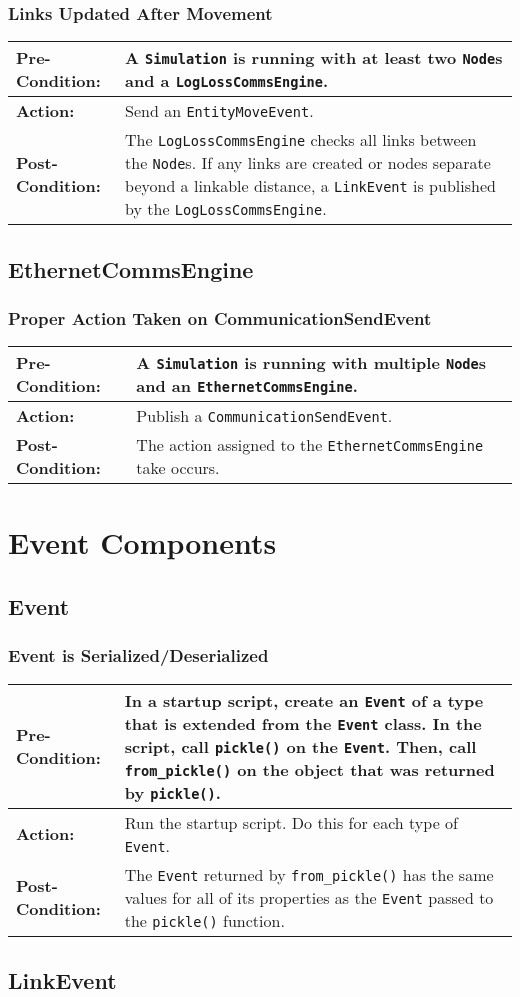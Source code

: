 \documentclass[titlepage]{article}
\newcommand{\testcase}[3]{
    \begin{center}
    \begin{tabular}{| l | p{0.7\textwidth}|}
        \hline
        \rowcolor[gray]{0.8}\textbf{Pre-Condition:} & #1 \\ \hline
        \textbf{Action:} & #2 \\ \hline
        \rowcolor[gray]{0.8}\textbf{Post-Condition:} & #3 \\ \hline
    \end{tabular}
    \end{center}
}
\begin{document}
\subsubsection{Links Updated After Movement}
\testcase{A \texttt{Simulation} is running with at least two \texttt{Node}s and a \texttt{LogLossCommsEngine}.}{Send an \texttt{EntityMoveEvent}.}{The \texttt{LogLossCommsEngine} checks all links between the \texttt{Node}s. If any links are created or nodes separate beyond a linkable distance, a \texttt{LinkEvent} is published by the \texttt{LogLossCommsEngine}.}

\subsection{EthernetCommsEngine}
\subsubsection{Proper Action Taken on CommunicationSendEvent}
\testcase{A \texttt{Simulation} is running with multiple \texttt{Node}s and an \texttt{EthernetCommsEngine}.}{Publish a \texttt{CommunicationSendEvent}.}{The action assigned to the \texttt{EthernetCommsEngine} take occurs.}

\section{Event Components}
\subsection{Event}
\subsubsection{Event is Serialized/Deserialized}
\testcase{In a startup script, create an \texttt{Event} of a type that is extended from the \texttt{Event} class. In the script, call \texttt{pickle()} on the \texttt{Event}. Then, call \texttt{from\_pickle()} on the object that was returned by \texttt{pickle()}.}{Run the startup script. Do this for each type of \texttt{Event}.}{The \texttt{Event} returned by \texttt{from\_pickle()} has the same values for all of its properties as the \texttt{Event} passed to the \texttt{pickle()} function.}

\subsection{LinkEvent}
\end{document}
